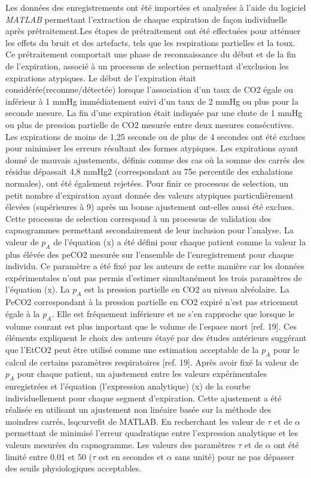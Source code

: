 \documentclass[12pt,]{article}
\begin{document}
Les données des enregistrements ont été importées et analysées à l'aide
du logiciel \emph{MATLAB} permettant l'extraction de chaque expiration
de façon individuelle après prétraitement.Les étapes de prétraitement
ont été effectuées pour atténuer les effets du bruit et des artefacts,
tels que les respirations partielles et la toux. Ce prétraitement
comportait une phase de reconnaissance du début et de la fin de
l'expiration, associé à un processus de selection permettant d'exclusion
les expirations atypiques. Le début de l'expiration était
considérée(reconnue/détectée) lorsque l'association d'un taux de CO2
égale ou inférieur à 1 mmHg immédiatement suivi d'un taux de 2 mmHg ou
plus pour la seconde mesure. La fin d'une expiration était indiquée par
une chute de 1 mmHg ou plus de pression partielle de CO2 mesurée entre
deux mesures consécutives. Les expirations de moins de 1,25 seconde ou
de plus de 4 secondes ont été exclues pour minimiser les erreurs
résultant des formes atypiques. Les expirations ayant donné de mauvais
ajustements, définis comme des cas où la somme des carrés des résidus
dépassait 4,8 mmHg2 (correspondant au 75e percentile des exhalations
normales), ont été également rejetées. Pour finir ce processus de
selection, un petit nombre d'expiration ayant donnée des valeurs
atypiques particulièrement élevées (supérieures à 9) après un bonne
ajustement ont-elles aussi été exclues. Cette processus de selection
correspond à un processus de validation des capnogrammes permettant
secondairement de leur inclusion pour l'analyse. La valeur de \(p_{A}\)
de l'équation (x) a été défini pour chaque patient comme la valeur la
plus élévée des peCO2 mesurée sur l'ensemble de l'enregistrement pour
chaque individu. Ce paramètre a été fixé par les auteurs de cette
manière car les données expérimentales n'ont pas permis d'estimer
simultanément les trois paramètres de l'équation (x). La \(p_{A}\) est
la pression partielle en CO2 au niveau alvéolaire. La PeCO2
correspondant à la pression partielle en CO2 expiré n'est pas stricement
égale à la \(p_{A}\). Elle est fréquement inférieure et ne s'en
rapproche que lorsque le volume courant est plus important que le volume
de l'espace mort {[}ref. 19{]}. Ces éléments expliquent le choix des
auteurs étayé par des études antérieurs suggérant que l'EtCO2 peut être
utilisé comme une estimation acceptable de la \(p_{A}\) pour le calcul
de certains paramètres respiratoires {[}ref. 19{]}. Après avoir fixé la
valeur de \(p_{A}\) pour chaque patient, un ajustement entre les valeurs
expérimentales enregistrées et l'équation (l'expression analytique) (x)
de la courbe individuellement pour chaque segment d'expiration. Cette
ajustement a été réalisée en utilisant un ajustement non linéaire basée
sur la méthode des moindres carrés, lsqcurvefit de MATLAB. En
recherchant les valeur de \(\tau\) et de \(\alpha\) permettant de
minimisé l'erreur quadratique entre l'expression analytique et les
valeurs mesurées du capnogramme. Les valeurs des paramètres \(\tau\) et
de \(\alpha\) ont été limité entre 0.01 et 50 (\(\tau\) est en secondes
et \(\alpha\) sans unité) pour ne pas dépasser des seuils physiologiques
acceptables.
\end{document}
